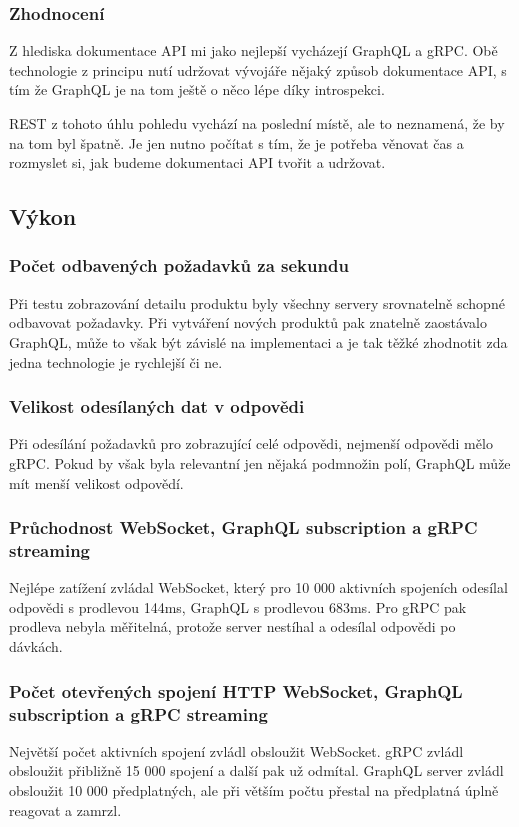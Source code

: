 \documentclass[thesis=M,czech]{FITthesis}[2019/12/23]
\begin{document}
\subsubsection*{Zhodnocení}
Z hlediska dokumentace API mi jako nejlepší vycházejí GraphQL a gRPC. Obě technologie z principu nutí udržovat vývojáře nějaký způsob dokumentace API, s tím že GraphQL je na tom ještě o něco lépe díky introspekci.

REST z tohoto úhlu pohledu vychází na poslední místě, ale to neznamená, že by na tom byl špatně. Je jen nutno počítat s tím, že je potřeba věnovat čas a rozmyslet si, jak budeme dokumentaci API tvořit a udržovat.

\subsection{Výkon}

\subsubsection*{Počet odbavených požadavků za sekundu}
Při testu zobrazování detailu produktu byly všechny servery srovnatelně schopné odbavovat požadavky. Při vytváření nových produktů pak znatelně zaostávalo GraphQL, může to však být závislé na implementaci a je tak těžké zhodnotit zda jedna technologie je rychlejší či ne.
\subsubsection*{Velikost odesílaných dat v odpovědi}
Při odesílání požadavků pro zobrazující celé odpovědi, nejmenší odpovědi mělo gRPC. Pokud by však byla relevantní jen nějaká podmnožin polí, GraphQL může mít menší velikost odpovědí.
\subsubsection*{Průchodnost WebSocket, GraphQL subscription a gRPC streaming}
Nejlépe zatížení zvládal WebSocket, který pro 10 000 aktivních spojeních odesílal odpovědi s prodlevou 144ms, GraphQL s prodlevou 683ms. Pro gRPC pak prodleva nebyla měřitelná, protože server nestíhal a odesílal odpovědi po dávkách.
\subsubsection*{Počet otevřených spojení HTTP WebSocket, GraphQL subscription a gRPC streaming}
Největší počet aktivních spojení zvládl obsloužit WebSocket. gRPC zvládl obsloužit přibližně 15 000 spojení a další pak už odmítal. GraphQL server zvládl obsloužit 10 000 předplatných, ale při větším počtu přestal na předplatná úplně reagovat a zamrzl.
\end{document}
